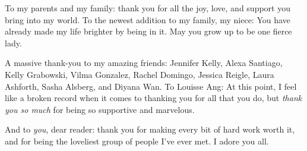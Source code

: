 To my parents and my family: thank you for all the joy, love, and support you bring into my world. To the newest addition to my family, my niece: You have already made my life brighter by being in it. May you grow up to be one fierce lady.

A massive thank-you to my amazing friends: Jennifer Kelly, Alexa Santiago, Kelly Grabowski, Vilma Gonzalez, Rachel Domingo, Jessica Reigle, Laura Ashforth, Sasha Alsberg, and Diyana Wan. To Louisse Ang:
At this point, I feel like a broken record when it comes to thanking you for all that you do, but \emph{thank you so much} for being so supportive and marvelous.

And to \emph{you}, dear reader: thank you for making every bit of hard work worth it, and for being the loveliest group of people I've ever met. I adore you all.
